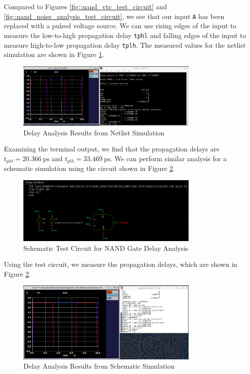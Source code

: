 \documentclass{article}
\begin{document}
	\noindent Compared to Figures \ref{fig::nand_vtc_test_circuit} and \ref{fig::nand_noise_analysis_test_circuit}, we see that our input \texttt{A} has been replaced with a pulsed voltage source. We can use rising edges of the input to measure the low-to-high propagation delay \texttt{tphl} and falling edges of the input to measure high-to-low propagation delay \texttt{tplh}. The measured values for the netlist simulation are shown in Figure \ref{fig::nand_delay_analysis}.
	
	\begin{figure}[H]
		\centerline{\includegraphics[width=0.8\textwidth]{nand_delay_analysis.png}}
		\caption{Delay Analysis Results from Netlist Simulation}
		\label{fig::nand_delay_analysis}
	\end{figure}
	
	\noindent Examining the terminal output, we find that the propagation delays are $t_{phl} = 20.366\ \text{ps}$ and $t_{plh} = 33.469\ \text{ps}$. We can perform similar analysis for a schematic simulation using the circuit shown in Figure \ref{fig::nand_delay_analysis_test_circuit_schem}.
	
	\begin{figure}[H]
		\centerline{\includegraphics[width=0.8\textwidth]{nand_delay_analysis_test_circuit.png}}
		\caption{Schematic Test Circuit for NAND Gate Delay Analysis}
		\label{fig::nand_delay_analysis_test_circuit_schem}
	\end{figure}
	
	\noindent Using the test circuit, we measure the propagation delays, which are shown in Figure \ref{fig::nand_delay_analysis_test_circuit_schem}.
	
	\begin{figure}[H]
		\centerline{\includegraphics[width=0.8\textwidth]{nand_delay_analysis_schem.png}}
		\caption{Delay Analysis Results from Schematic Simulation}
		\label{fig::nand_delay_analysis_schem}
	\end{figure}
	
\end{document}
